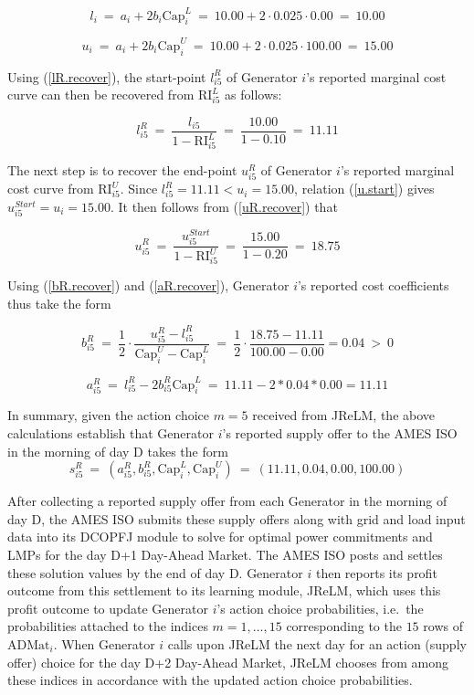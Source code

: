 \documentclass[12pt]{article}
\begin{document}
\[ l_i~ = ~a_i + 2b_i \mbox{Cap}_i^L ~=~ 10.00 + 2\cdot 0.025 \cdot 0.00 ~= ~10.00\]

\[ u_i ~=~ a_i + 2b_i \mbox{Cap}_i^U~ = ~10.00 + 2\cdot 0.025 \cdot 100.00 ~=~ 15.00 \]

\smallskip
\noindent
Using (\ref{lR.recover}), the start-point $l_{i5}^R$ of Generator $i$'s reported marginal cost curve can then be recovered from $\mbox{RI}^L_{i5}$ as follows:

\[ l_{i5}^R ~=~ \frac{l_{i5}}{1- \mbox{RI}_{i5}^L}~ = ~\frac{10.00}{1 - 0.10}~ =~ 11.11\]

\smallskip
\noindent
The next step is to recover the end-point $u_{i5}^R$ of Generator $i$'s reported marginal cost curve from
$\mbox{RI}^U_{i5}$.  Since $l_{i5}^R = 11.11 < u_i = 15.00$, 
relation (\ref{u.start}) gives $u_{i5}^{Start} = u_i = 15.00$. 
It then follows from (\ref{uR.recover}) that

\[ u_{i5}^R ~=~ \frac{u_{i5}^{Start}}{1- \mbox{RI}_{i5}^U} ~= ~\frac{15.00}{1 - 0.20} ~= ~18.75 \]

\smallskip
\noindent
Using (\ref{bR.recover}) and (\ref{aR.recover}), Generator $i$'s reported cost coefficients thus take the form

\[ b_{i5}^R ~=~ \frac{1}{2} \cdot \frac{u_{i5}^R - l_{i5}^R}{\mbox{Cap}_i^{U} - \mbox{Cap}_i^{L}}~ 
     =~ \frac{1}{2} \cdot \frac{18.75 - 11.11}{100.00 - 0.00} = 0.04 ~>~0\]

\[ a_{i5}^R ~=~ l_{i5}^R - 2 b_{i5}^R \mbox{Cap}_i^L ~=~ 11.11 - 2 *0.04 * 0.00 = 11.11\]


In summary, given the action choice $m=5$ received from JReLM, the above calculations establish that Generator $i$'s reported supply offer to the AMES ISO in the morning of day D takes the form 
                     \begin{equation}
         s^R_{i5} ~ = ~(a_{i5}^R,b_{i5}^R,\mbox{Cap}^{L}_{i},\mbox{Cap}^{U}_{i}) ~=~ (11.11, 0.04, 0.00, 100.00)
               \end{equation}

\smallskip
\noindent
After collecting a reported supply offer from each Generator in the morning of day D, the AMES ISO submits these supply offers along with grid and load input data into its DCOPFJ module to solve for optimal power commitments and LMPs for the day D+1  Day-Ahead Market.  The AMES ISO posts and settles these solution values by the end of day D.  Generator $i$ then reports its profit outcome from this settlement to its learning module, JReLM, which uses this profit outcome to update Generator $i$'s action choice probabilities, i.e.\ the probabilities attached to the indices $m = 1,\ldots,15$ corresponding to the $15$ rows of $\mbox{ADMat}_i$.  When Generator $i$ calls upon JReLM the next day for an action (supply offer) choice for the day D+2 Day-Ahead Market, JReLM chooses from among these indices in accordance with the updated action choice probabilities.
\end{document}

